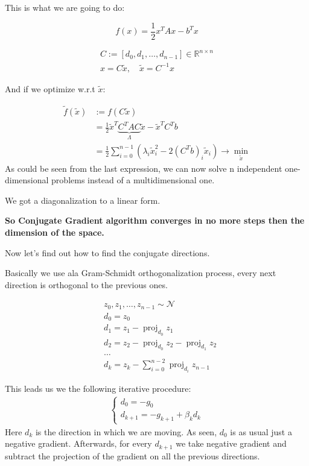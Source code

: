 This is what we are going to do: 

\[ 
    f(x) = \frac{1}{2} x^T A x - b^T x 
\] 

\begin{gather*}
    C:= [d_0, d_1, \ldots, d_{n-1}] \in \mathbb{R}^{n \times n} \\ 
    x = C \tilde{x}, \quad \tilde{x} = C^{-1} x
\end{gather*}

And if we optimize w.r.t $\tilde{x}$: 

\begin{align*}
    \tilde{f}(\tilde{x}) &:= f(C \tilde{x}) \\ 
    &= \frac{1}{2} \tilde{x}^T \underbrace{C^T A C}_{\Lambda} \tilde{x} - \tilde{x}^T C^T b \\
    &= \frac{1}{2} \sum^{n-1}_{i=0} \left(\lambda_i \tilde{x}_i^2 - 2 (C^T b)_i \tilde{x}_i \right) \to \min_{\tilde{x}}
\end{align*}
As could be seen from the last expression, we can now solve n independent one-dimensional problems instead of a multidimensional one.

We got a diagonalization to a linear form.


\textbf{So Conjugate Gradient algorithm converges in no more steps then the dimension of the space.}

Now let's find out how to find the conjugate directions.

Basically we use ala Gram-Schmidt orthogonalization process, every next direction is orthogonal to the previous ones.

\begin{align*}
    &z_0, z_1, \ldots, z_{n-1} \sim \mathcal{N} \\ 
    &d_0 = z_0 \\ 
    &d_1 = z_1 - \operatorname{proj}_{d_0} z_1 \\
    &d_2 = z_2 - \operatorname{proj}_{d_0} z_2 - \operatorname{proj}_{d_1} z_2 \\
    &\ldots \\
    &d_k = z_k - \sum^{n-2}_{i=0} \operatorname{proj}_{d_i} z_{n - 1}
\end{align*}

This leads us we the following iterative procedure:
\begin{gather*}
    \begin{cases}
        d_0 = -g_0 \\ 
        d_{k+1} = -g_{k+1} + \beta_k d_k
    \end{cases}
\end{gather*}
Here $d_k$ is the direction in which we are moving. As seen, $d_0$ is as usual just a negative gradient. Afterwards, for every $d_{k+1}$ we take negative gradient and subtract the projection of the gradient on all the previous directions. 

